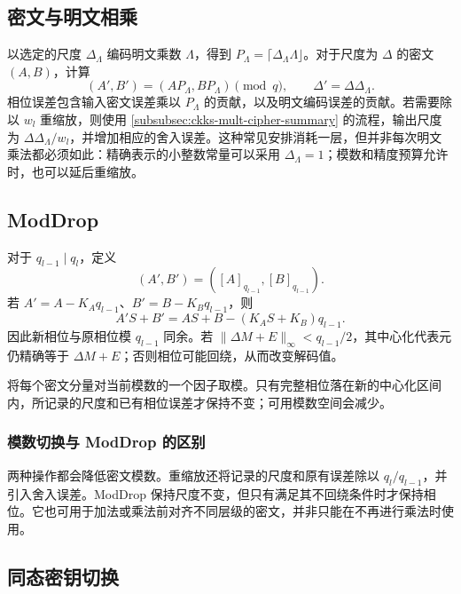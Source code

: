 \subsection{密文与明文相乘}
\label{subsec:ckks-mult-plain}

以选定的尺度 $\Delta_\Lambda$ 编码明文乘数 $\Lambda$，得到 $P_\Lambda=\lceil\Delta_\Lambda\Lambda\rfloor$。对于尺度为 $\Delta$ 的密文 $(A,B)$，计算
\[
(A',B')=(AP_\Lambda,BP_\Lambda)\pmod q,
\qquad \Delta'=\Delta\Delta_\Lambda.
\]
相位误差包含输入密文误差乘以 $P_\Lambda$ 的贡献，以及明文编码误差的贡献。若需要除以 $w_l$ 重缩放，则使用 \autoref{subsubsec:ckks-mult-cipher-summary} 的流程，输出尺度为 $\Delta\Delta_\Lambda/w_l$，并增加相应的舍入误差。这种常见安排消耗一层，但并非每次明文乘法都必须如此：精确表示的小整数常量可以采用 $\Delta_\Lambda=1$；模数和精度预算允许时，也可以延后重缩放。


\subsection{\textsf{ModDrop}}
\label{subsec:ckks-moddrop}

对于 $q_{l-1}\mid q_l$，定义
\[
(A',B')=([A]_{q_{l-1}},[B]_{q_{l-1}}).
\]
若 $A'=A-K_Aq_{l-1}$、$B'=B-K_Bq_{l-1}$，则
\[
A'S+B'=AS+B-(K_AS+K_B)q_{l-1}.
\]
因此新相位与原相位模 $q_{l-1}$ 同余。若 $\|\Delta M+E\|_\infty<q_{l-1}/2$，其中心化代表元仍精确等于 $\Delta M+E$；否则相位可能回绕，从而改变解码值。

\begin{tcolorbox}[title={\textbf{\tboxlabel{\ref*{subsec:ckks-moddrop}} CKKS \textsf{ModDrop}}}]
将每个密文分量对当前模数的一个因子取模。只有完整相位落在新的中心化区间内，所记录的尺度和已有相位误差才保持不变；可用模数空间会减少。
\end{tcolorbox}

\subsubsection{模数切换与 \textsf{ModDrop} 的区别}
\label{subsubsec:ckks-moddrop-vs-modswitch}

两种操作都会降低密文模数。重缩放还将记录的尺度和原有误差除以 $q_l/q_{l-1}$，并引入舍入误差。\textsf{ModDrop} 保持尺度不变，但只有满足其不回绕条件时才保持相位。它也可用于加法或乘法前对齐不同层级的密文，并非只能在不再进行乘法时使用。

\subsection{同态密钥切换}
\label{subsec:ckks-key-switching}

